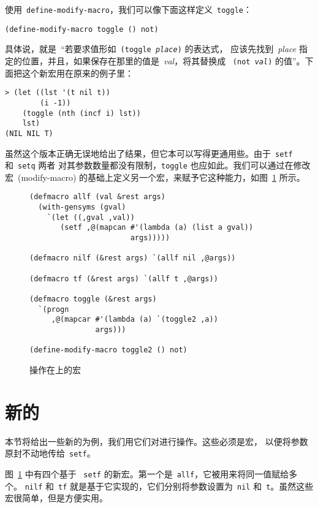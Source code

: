使用~\verb|define-modify-macro|，我们可以像下面这样定义~\verb|toggle|：
\begin{lstlisting}
(define-modify-macro toggle () not)
\end{lstlisting}
具体说，就是~``若要求值形如~\texttt{(toggle \emph{place})} 的表达式，
应该先找到~\emph{place} 指定的位置，并且，如果保存在那里的值是~\emph{val}，将其替换成
~\texttt{(not \emph{val})} 的值''。下面把这个新宏用在原来的例子里：
\begin{lstlisting}
> (let ((lst '(t nil t))
        (i -1))
    (toggle (nth (incf i) lst))
    lst)
(NIL NIL T)
\end{lstlisting}

虽然这个版本正确无误地给出了结果，但它本可以写得更通用些。由于~\verb|setf| 和~\verb|setq| 两者
对其参数数量都没有限制，\verb|toggle| 也应如此。我们可以通过在修改宏~(modify-macro)
的基础上定义另一个宏，来赋予它这种能力，如图~\ref{fig:macros_which_operate_on_generalized_variables} 所示。

\begin{figure}
\begin{lstlisting}
(defmacro allf (val &rest args)
  (with-gensyms (gval)
    `(let ((,gval ,val))
       (setf ,@(mapcan #'(lambda (a) (list a gval))
                       args)))))

(defmacro nilf (&rest args) `(allf nil ,@args))

(defmacro tf (&rest args) `(allf t ,@args))

(defmacro toggle (&rest args)
  `(progn
     ,@(mapcar #'(lambda (a) `(toggle2 ,a))
               args)))

(define-modify-macro toggle2 () not)
\end{lstlisting}
  \caption{操作在\gv{}上的宏}
  \label{fig:macros_which_operate_on_generalized_variables}
\end{figure}

\section{新的\utility{}}
\label{sec:new_utilities}

本节将给出一些新的\utility{}为例，我们用它们对\gv{}进行操作。这些\utility{}必须是宏，
以便将参数原封不动地传给~\verb|setf|。

图~\ref{fig:macros_which_operate_on_generalized_variables} 中有四个基于
~\verb|setf| 的新宏。第一个是~\verb|allf|，它被用来将同一值赋给多个\gv{}。
\verb|nilf| 和~\verb|tf| 就是基于它实现的，它们分别将参数设置为~\verb|nil|
和~\verb|t|。虽然这些宏很简单，但是方便实用。


